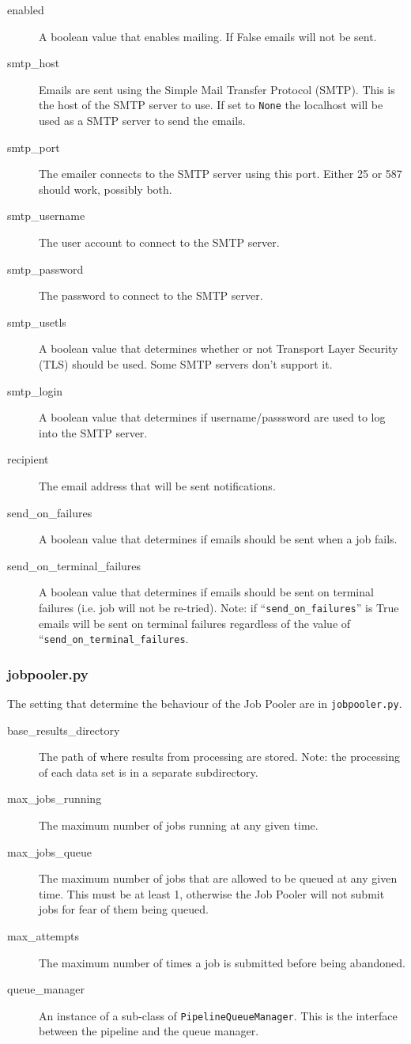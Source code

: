 \documentclass[12pt]{article}
\begin{document}
\begin{description}
    \item[enabled] A boolean value that enables mailing. If False emails will not be sent.
    \item[smtp\_host] Emails are sent using the Simple Mail Transfer Protocol (SMTP). This is the host of the SMTP server to use. If set to \texttt{None} the localhost will be used as a SMTP server to send the emails.
    \item[smtp\_port] The emailer connects to the SMTP server using this port. Either 25 or 587 should work, possibly both.
    \item[smtp\_username] The user account to connect to the SMTP server.
    \item[smtp\_password] The password to connect to the SMTP server.
    \item[smtp\_usetls] A boolean value that determines whether or not Transport Layer Security (TLS) should be used. Some SMTP servers don't support it.
    \item[smtp\_login] A boolean value that determines if username/passsword are used to log into the SMTP server.
    \item[recipient] The email address that will be sent notifications.
    \item[send\_on\_failures] A boolean value that determines if emails should be sent when a job fails.
    \item[send\_on\_terminal\_failures] A boolean value that determines if emails should be sent on terminal failures (i.e. job will not be re-tried). Note: if ``\texttt{send\_on\_failures}'' is True emails will be sent on terminal failures regardless of the value of ``\texttt{send\_on\_terminal\_failures}.
\end{description}


\subsubsection{jobpooler.py}
The setting that determine the behaviour of the Job Pooler are in \texttt{jobpooler.py}.

\begin{description}
    \item[base\_results\_directory] The path of where results from processing are stored. Note: the processing of each data set is in a separate subdirectory.
    \item[max\_jobs\_running] The maximum number of jobs running at any given time.
    \item[max\_jobs\_queue] The maximum number of jobs that are allowed to be queued at any given time. This must be at least 1, otherwise the Job Pooler will not submit jobs for fear of them being queued.
    \item[max\_attempts] The maximum number of times a job is submitted before being abandoned.
    \item[queue\_manager] An instance of a sub-class of \texttt{PipelineQueueManager}. This is the interface between the pipeline and the queue manager.
\end{description}
\end{document}
